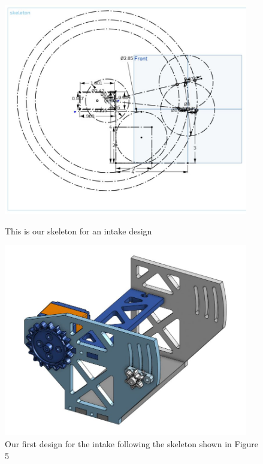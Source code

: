 \begin{figure}[ht]
\centering
\begin{minipage}[b]{.48\textwidth}
  \centering
  \includegraphics[width=0.95\textwidth]{Meetings/August/08-20-21/8-18-21_CAD_Image5 - Nathan Forrer.jpg}
  \caption{This is our skeleton for an intake design}
  \label{fig:pic5}
\end{minipage}%
\hfill%
\begin{minipage}[b]{.48\textwidth}
  \centering
  \includegraphics[width=0.95\textwidth]{Meetings/August/08-20-21/8-18-21_CAD_Image6 - Nathan Forrer.jpg}
  \caption{Our first design for the intake following the skeleton shown in Figure 5}
  \label{fig:pic6}
\end{minipage}
\end{figure}

